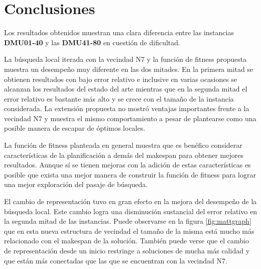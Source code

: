 \section{Conclusiones}
Los resultados obtenidos muestran una clara diferencia entre las instancias \textbf{DMU01-40} y las \textbf{DMU41-80} en cuestión de dificultad. 

La búsqueda local iterada con la vecindad N7 y la función de fitness propuesta muestra un desempeño muy diferente en las dos mitades. En la primera mitad se obtienen resultados con bajo error relativo e inclusive en varias ocasiones se alcanzan los resultados del estado del arte mientras que en la segunda mitad el error relativo es bastante más alto y se crece con el tamaño de la instancia considerada. 
La extensión propuesta no mostró ventajas importantes frente a la vecindad N7 y muestra el mismo comportamiento a pesar de plantearse como una posible manera de escapar de óptimos locales. 

La función de fitness planteada en general muestra que es benéfico considerar características de la planificación a demás del makespan para obtener mejores resultados. Aunque sí se tienen mejoras con la adición de estas características es posible que exista una mejor manera de construir la función de fitness para lograr una mejor exploración del pasaje de búsqueda.

El cambio de representación tuvo en gran efecto en la mejora del desempeño de la búsqueda local. Este cambio logra una disminución sustancial del error relativo en la segunda mitad de las instancias. Puede observarse en la figura \ref{fig:mattgraph} que en esta nueva estructura de vecindad el tamaño de la misma está mucho más relacionado con el makespan de la solución. También puede verse que el cambio de representación desde un inicio restringe a soluciones de mucha más calidad y que están más conectadas que las que se encuentran con la vecindad N7. 



